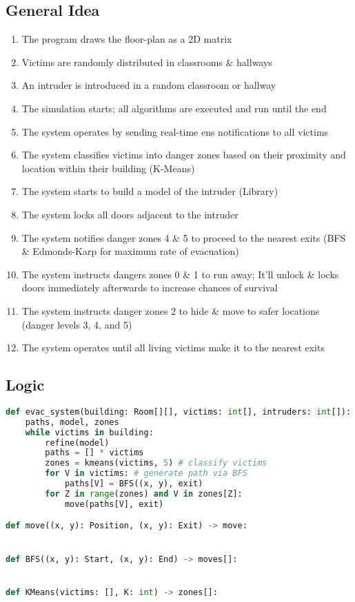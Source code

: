 \documentclass[12pt]{article}
\begin{document}
\subsection*{General Idea}
\begin{enumerate}
\item The program draws the floor-plan as a 2D matrix
\item Victims are randomly distributed in classrooms \& hallways
\item An intruder is introduced in a random classroom or hallway
\item The simulation starts; all algorithms are executed and run until the end
\item The system operates by sending real-time ens notifications to all victims
\item The system classifies victims into danger zones based on their proximity and location within their building (K-Means)
\item The system starts to build a model of the intruder (Library)
\item The system locks all doors adjacent to the intruder
\item The system notifies danger zones 4 \& 5 to proceed to the nearest exits (BFS \& Edmonds-Karp for maximum rate of evacuation)
\item The system instructs dangers zones 0 \& 1 to run away; It'll unlock \& locks doors immediately afterwards to increase chances of survival
\item The system instructs danger zones 2 to hide \& move to safer locations (danger levels 3, 4, and 5)
\item The system operates until all living victims make it to the nearest exits
\end{enumerate}
\subsection*{Logic}
\begin{lstlisting}[language=python]
def evac_system(building: Room[][], victims: int[], intruders: int[]):
	paths, model, zones
	while victims in building: 
		refine(model)
		paths = [] * victims
		zones = kmeans(victims, 5) # classify victims
		for V in victims: # generate path via BFS
			paths[V] = BFS((x, y), exit) 
		for Z in range(zones) and V in zones[Z]:
			move(paths[V], exit)

def move((x, y): Position, (x, y): Exit) -> move:


def BFS((x, y): Start, (x, y): End) -> moves[]:


def KMeans(victims: [], K: int) -> zones[]:

\end{lstlisting}
\end{document}
